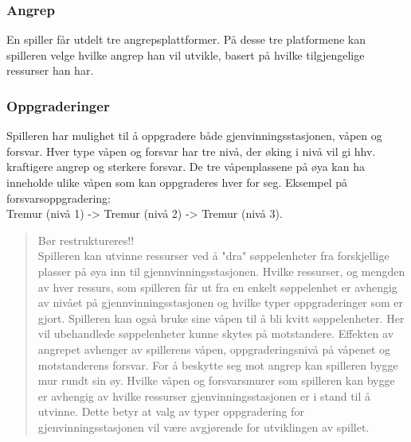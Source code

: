 \subsubsection{Angrep}
En spiller får utdelt tre angrepsplattformer. På desse tre platformene
kan spilleren velge hvilke angrep han vil utvikle, basert på hvilke
tilgjengelige ressurser han har.
\subsubsection{Oppgraderinger}
Spilleren har mulighet til å oppgradere både gjenvinningsstasjonen,
våpen og forsvar. Hver type våpen og forsvar har tre nivå, der øking i
nivå vil gi hhv. kraftigere angrep og sterkere forsvar. De tre
våpenplassene på øya kan ha inneholde ulike våpen som kan oppgraderes
hver for seg.
Eksempel på forsvarsoppgradering:\\
Tremur (nivå 1) -> Tremur (nivå 2) -> Tremur (nivå 3).
\begin{quote}
Bør restruktureres!!\\
Spilleren kan utvinne ressurser ved å "dra" søppelenheter fra
forskjellige plasser på øya inn til gjennvinningsstasjonen. Hvilke
ressurser, og mengden av hver ressurs, som spilleren får ut fra en
enkelt søppelenhet er avhengig av nivået på gjennvinningsstasjonen og
hvilke typer oppgraderinger som er gjort. Spilleren kan også bruke sine
våpen til å bli kvitt søppelenheter. Her vil ubehandlede søppelenheter
kunne skytes på motstandere. Effekten av angrepet avhenger av spillerens
våpen, oppgraderingsnivå på våpenet og motstanderens forsvar. For å
beskytte seg mot angrep kan spilleren bygge mur rundt sin øy. Hvilke
våpen og forsvarsmurer som spilleren kan bygge er avhengig av hvilke
ressurser gjenvinningsstasjonen er i stand til å utvinne. Dette betyr at
valg av typer oppgradering for gjenvinningsstasjonen vil være avgjørende
for utviklingen av spillet.\\
\end{quote}
